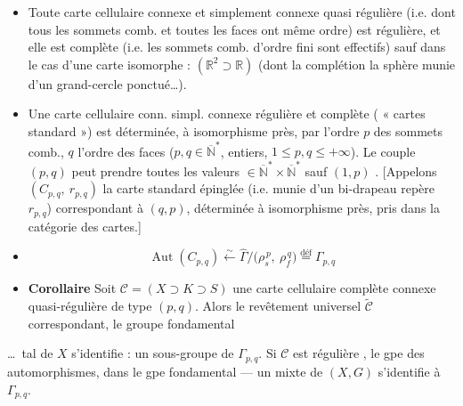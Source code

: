 \documentclass[11pt,a4paper]{article}
\begin{document}

\begin{itemize}
  \item[(1)] Toute carte cellulaire \add{$\neq \emptyset$} connexe et
    simplement connexe quasi régulière (i.e. dont tous les sommets comb. et
    toutes les faces ont même ordre) est régulière, et elle est complète (i.e.
    les sommets comb. d'ordre fini sont effectifs) sauf dans le cas d'une carte
    isomorphe : $(\mathbb{R}^2 \supset \mathbb{R})$ (dont la complétion \ill{}
    la sphère munie d'un grand-cercle ponctué\ldots).

  \item[(2)] Une carte cellulaire \add{$\neq \emptyset$} conn. simpl. connexe
    régulière  et complète (\struck{\ill{}}
    « cartes standard ») est déterminée, à isomorphisme près, par
     l'ordre $p$ des sommets comb., $q$ l'ordre des
    faces ($p, q \in \overline{\mathbb{N}}^*$, entiers,
    $1 \leqslant p, q \leqslant +\infty$). Le couple $(p,q)$ peut prendre
    toutes les valeurs \struck{\ill{}} $\in \overline{\mathbb{N}}^* \times
    \overline{\mathbb{N}}^*$ sauf $(1,p)$ .
    [Appelons $(C_{p,q},\ r_{p,q})$ la carte standard épinglée (i.e. munie d'un
    bi-drapeau repère $r_{p,q}$) correspondant à $(q,p)$, déterminée à
     isomorphisme près, pris dans la
    catégorie  des cartes.]

  \item[(3)] \struck{\ill{}}
    \[
      \operatorname{Aut}(C_{p,q})
      \overset{\sim}{\longleftarrow}
      \widehat{\Gamma}\big/\bigl(\rho_s^{\,p},\ \rho_f^{\,q}\bigr)
      \overset{\text{déf}}{=} \Gamma_{p,q}
    \]

  \item[(4)] \textbf{Corollaire} Soit $\mathcal{C} = (X \supset K \supset S)$
    une carte cellulaire complète \ill{} connexe quasi-régulière de type
    $(p,q)$. Alors le revêtement universel $\widetilde{\mathcal{C}}$
    correspondant, le groupe fondamental
\end{itemize}


\ldots\ tal de $X$ s'identifie : \ill{} un sous-groupe de \struck{$\Gamma$}
$\Gamma_{p,q}$. Si $\mathcal{C}$ est régulière , \ill{} le gpe
des \struck{\ill{}} automorphismes, dans le gpe fondamental — \ill{} un
 mixte de $(X, G)$ s'identifie à $\Gamma_{p,q}$.
\end{document}
